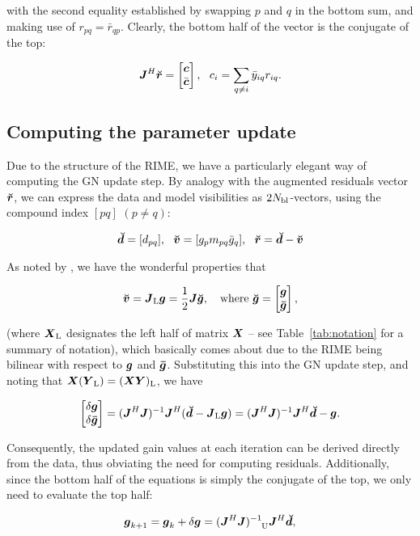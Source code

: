 \documentclass[useAMS,usenatbib]{mn2e}
\makeatletter
\newcommand{\vecg}{\bmath{g}}
\newcommand{\vecgc}{\bmath{\bar g}}
\newcommand{\mat}[1]{{\bmath{#1}}}
\newcommand{\JJ}{\mat{J}} %
\newcommand{\JHJ}{\JJ^H\JJ} %
\newcommand{\Matrix}[2]{\left [ \begin{array}{@{}#1@{}}#2\end{array} \right ]}
\newcommand{\AUG}[1]{\bmath{\breve{#1}}}
\newcommand{\Gg}{\AUG{g}}
\newcommand{\Rr}{\AUG{r}}
\newcommand{\Dd}{\AUG{d}}
\newcommand{\Vv}{\AUG{v}}
\newcommand{\TOP}{\mathrm{U}}%
\newcommand{\LEFT}{\mathrm{L}}
\makeatother
\begin{document}
with the second equality established by swapping $p$ and $q$ in the bottom sum, and making use of $r_{pq}=\bar{r}_{qp}$. Clearly, the bottom half of the vector is the conjugate of the top:

\begin{equation}
\label{eq:JHR:DI1}
\JJ^H\Rr = \Matrix{c}{\bmath{c}\\\bar{\bmath{c}}},~~c_i = \sum\limits_{q\ne i} \bar{y}_{iq} r_{iq}.
\end{equation}


\subsection{Computing the parameter update}

Due to the structure of the RIME, we have a particularly elegant way of computing the GN update step.
By analogy with the augmented residuals vector $\Rr$, we can express the data and model visibilities as $2N_\mathrm{bl}$-vectors,
using the compound index $[pq]$ $(p\ne q)$:

\[
\Dd = [ d_{pq} ],~~\Vv = [ g_p m_{pq} \bar{g}_q ],~~\Rr =\Dd-\Vv
\]

As noted by \citet{Tasse-cohjones}, we have the wonderful properties that

\begin{equation}
\label{eq:v_Jg}
\Vv = \JJ_\LEFT \bmath{g}  = \frac{1}{2}\JJ \Gg,~~~\mathrm{where}~\Gg = \Matrix{c}{\bmath{g} \\ \bmath{\bar g}},
\end{equation}

(where $\bmath{X}_\LEFT$ designates the left half of matrix $\bmath{X}$ -- see Table~\ref{tab:notation} for a summary of notation),
which basically comes about due to the RIME being bilinear with respect to $\bmath{g}$ and $\bmath{\bar g}$. 
Substituting this into the GN update step, and noting that $\bmath{X}(\bmath{Y}_\LEFT) = (\bmath{XY})_\LEFT$, 
we have 

\[
\Matrix{c}{\delta\vecg\\\delta\vecgc} = (\JHJ)^{-1} \JJ^H (\Dd - \JJ_\LEFT \vecg) = (\JHJ)^{-1} \JJ^H \Dd - \vecg.
\]

Consequently, the updated gain values at each iteration can be derived directly from the data, thus obviating the need
for computing residuals. Additionally, since the bottom half of the equations is simply the conjugate of the top, we only 
need to evaluate the top half:

\begin{equation}
\label{eq:ghat}
\vecg_{k+1} = \vecg_k + \delta\vecg = (\JHJ)^{-1}_{~~~\TOP} \JJ^H \Dd,
\end{equation}
\end{document}
